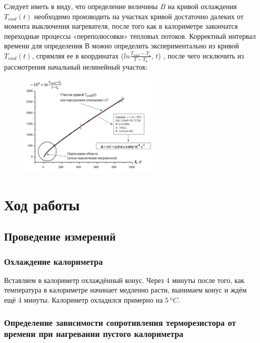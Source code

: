 \documentclass[a4paper, 12pt]{article}
\begin{document}
            Следует иметь в виду, что определение величины $B$ на кривой охлаждения $T_{cool}(t)$ необходимо производить на участках кривой достаточно далеких от момента выключения нагревателя, после того как в калориметре закончатся переходные процессы «переполюсовки» тепловых потоков. Корректный интервал времени для определения В можно определить экспериментально из кривой $T_{cool}(t)$, спрямляя ее в координатах ($ln \frac{T_{cool} - T_к}{T - T_к}$, $t$) , после чего исключить из рассмотрения начальный нелинейный участок:

            \begin{figure}[ht]
                \centering
                \includegraphics[width=0.6\textwidth]{img/not_lin_fragment.png}
            \end{figure}

    \section{Ход работы}

        \subsection{Проведение измерений}

            \subsubsection{Охлаждение калориметра}

                Вставляем в калориметр охлаждённый конус. Через 4 минуты после того, как температура в калориметре начинает медленно расти, вынимаем конус и ждём ещё 4 минуты. Калориметр охладился примерно на $5~^oC$.

            \subsubsection{Определение зависимости сопротивления терморезистора от времени при нагревании пустого калориметра}
\end{document}
